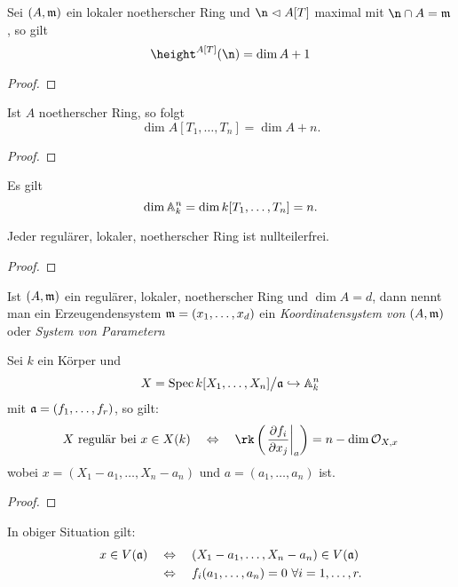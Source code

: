 \begin{lemma}
    Sei $(A,\mathfrak{m})$ ein lokaler noetherscher Ring und $\n \ideal A[T]$ maximal
    mit $\n\cap A = \m$, so gilt
    \[ \height^{A[T]} (\n) = \dim A + 1\]
\end{lemma}
\begin{proof}
\TODO
\end{proof}

\begin{korollar}
    Ist $A$ noetherscher Ring, so folgt 
    \[\dim A[T_1,\ldots,T_n] = \dim A + n.\]
\end{korollar}
\begin{proof}
\TODO
\end{proof}

\begin{korollar}
    Es gilt
    \[\dim \mathbb{A}^n_k = \dim k[T_1,\ldots,T_n] = n.\]
\end{korollar}

\begin{satz}
    Jeder regulärer, lokaler, noetherscher Ring ist nullteilerfrei.
\end{satz}
\begin{proof}
\TODO
\end{proof}

\begin{definition}[Koordinatensystem]
    \label{def:koordinatensystem}
    Ist $(A,\mathfrak{m})$ ein regulärer, lokaler, noetherscher Ring und $\dim A = d$,
    dann nennt man ein Erzeugendensystem $\mathfrak{m} = (x_1,\ldots,x_d)$
    ein \emph{Koordinatensystem von $(A,\mathfrak{m})$} oder
    \emph{System von Parametern}
\end{definition}

\begin{satz}
    Sei $k$ ein Körper und 
    \[X = \operatorname{Spec} k[X_1,\ldots,X_n]\big/\mathfrak{a} \hookrightarrow \mathbb{A}^n_k\]
    mit $\mathfrak{a} = (f_1,\ldots,f_r)$, so gilt:
    \[ X \text{ regulär bei }x\in X(k) \quad\Leftrightarrow\quad
        \rk\left(\left.\frac{\partial f_i}{\partial x_j}\right|_a\right) = 
        n - \dim \O_{X,x}\]
    wobei $x = (X_1 - a_1,\ldots,X_n-a_n)$ und $a = (a_1,\ldots,a_n)$ ist.
\end{satz}
\begin{proof}
\TODO
\end{proof}

\begin{bemerkung}
    In obiger Situation gilt:
    \begin{align*}
        x \in V(\mathfrak{a}) \quad&\Leftrightarrow\quad (X_1-a_1,\ldots,X_n-a_n) 
            \in V(\mathfrak{a})\\
        &\Leftrightarrow\quad
        f_i(a_1,\ldots,a_n) = 0\ \forall i=1,\ldots,r.
    \end{align*}
\end{bemerkung}

